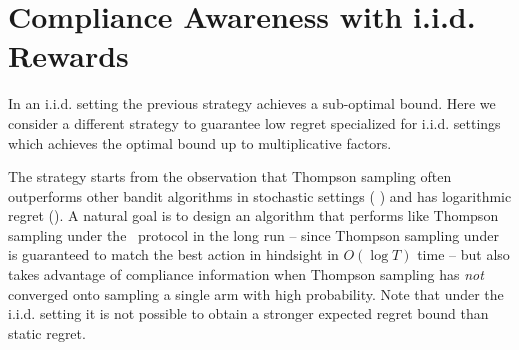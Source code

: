 
%
%
%
%
%


\section{Compliance Awareness with i.i.d. Rewards}


In an i.i.d. setting the previous strategy achieves a sub-optimal bound.
Here we consider a different strategy to guarantee low regret specialized for i.i.d. settings which achieves the optimal bound up to multiplicative factors. 



The strategy starts from the observation that Thompson sampling often outperforms other bandit algorithms in stochastic settings ( \cite{thompson:33, chapelle:11}) and has logarithmic regret (\cite{agrawal:12, kaufmann:12}). A natural goal is to design an algorithm that performs like Thompson sampling under the \chosen\, protocol in the long run -- since Thompson sampling under \chosen\, is guaranteed to match the best action in hindsight in $O(\log T)$ time -- but also takes advantage of compliance information when Thompson sampling has \emph{not} converged onto sampling a single arm with high probability. Note that under the i.i.d. setting it is not possible to obtain a stronger expected regret bound than static regret. 

